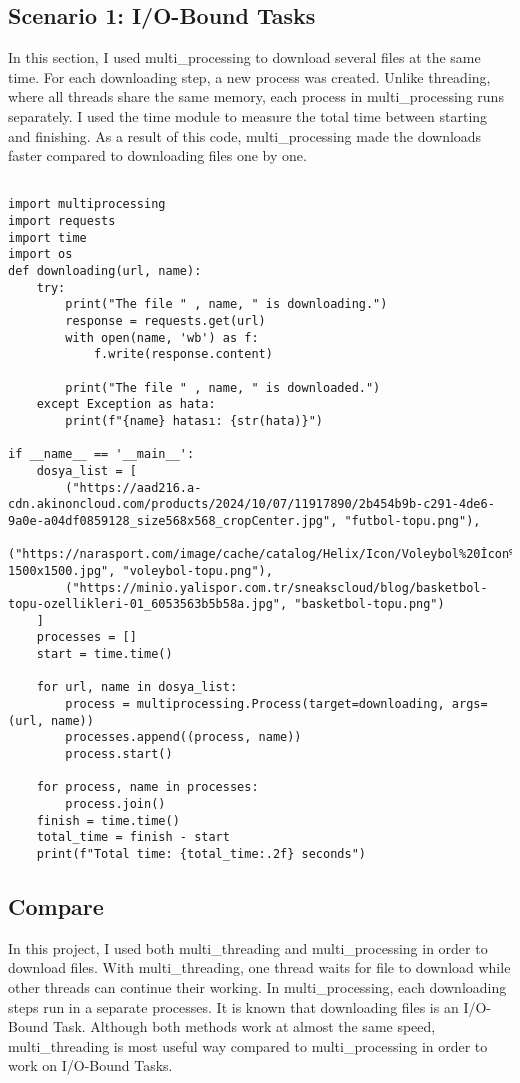 \documentclass[onecolumn]{article}
\begin{document}
\subsection{Scenario 1: I/O-Bound Tasks}

In this section, I used multi\_processing to download several files at the same time. For each downloading step, a new process was created. Unlike threading, where all threads share the same memory, each process in multi\_processing runs separately. I used the time module to measure the total time between starting and finishing. As a result of this code, multi\_processing made the downloads faster compared to downloading files one by one.

\begin{verbatim}

import multiprocessing
import requests 
import time
import os
def downloading(url, name):
    try:
        print("The file " , name, " is downloading.")
        response = requests.get(url)
        with open(name, 'wb') as f:
            f.write(response.content)
        
        print("The file " , name, " is downloaded.")
    except Exception as hata:
        print(f"{name} hatası: {str(hata)}")

if __name__ == '__main__':
    dosya_list = [
        ("https://aad216.a-cdn.akinoncloud.com/products/2024/10/07/11917890/2b454b9b-c291-4de6-9a0e-a04df0859128_size568x568_cropCenter.jpg", "futbol-topu.png"),
        ("https://narasport.com/image/cache/catalog/Helix/Icon/Voleybol%20İcon%202-1500x1500.jpg", "voleybol-topu.png"),
        ("https://minio.yalispor.com.tr/sneakscloud/blog/basketbol-topu-ozellikleri-01_6053563b5b58a.jpg", "basketbol-topu.png")
    ]
    processes = []
    start = time.time()

    for url, name in dosya_list:
        process = multiprocessing.Process(target=downloading, args=(url, name))
        processes.append((process, name))
        process.start()

    for process, name in processes:
        process.join()
    finish = time.time()
    total_time = finish - start
    print(f"Total time: {total_time:.2f} seconds")

\end{verbatim}


\pagebreak
\subsection{Compare}
In this project, I used both multi\_threading and multi\_processing in order to download files. With multi\_threading, one thread waits for file to download while other threads can continue their working. In multi\_processing, each downloading steps run in a separate processes. It is known that downloading files is an I/O-Bound Task. Although both methods work at almost the same speed, multi\_threading is most useful way compared to multi\_processing in order to work on I/O-Bound Tasks. 
\end{document}
